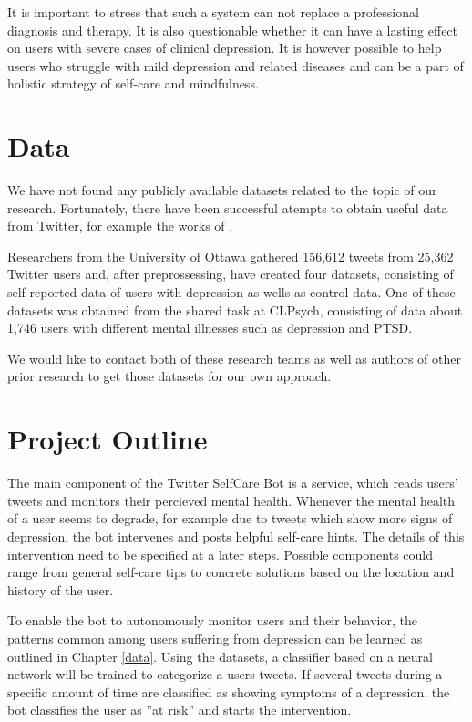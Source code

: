 \documentclass[colorback,accentcolor=tud9c]{tudreport}
\begin{document}
It is important to stress that such a system can not replace a professional diagnosis and therapy. It is also questionable whether it can have a lasting effect on users with severe cases of clinical depression. It is however possible to help users who struggle with mild depression and related diseases and can be a part of holistic strategy of self-care and mindfulness.

\section*{Data}
\label{data}

We have not found any publicly available datasets related to the topic of our research. Fortunately, there have been successful atempts to obtain useful data from Twitter, for example the works of \textcite{coppersmith2015clpsych,jamil_monitoring_2017}. 

Researchers from the University of Ottawa gathered 156,612 tweets from 25,362 Twitter users and, after preprossessing, have created four datasets, consisting of self-reported data of users with depression as wells as control data. One of these datasets was obtained from the shared task at CLPsych, consisting of data about 1,746 users with different mental illnesses such as depression and PTSD.

We would like to contact both of these research teams as well as authors of other prior research to get those datasets for our own approach. 

\section*{Project Outline}

The main component of the Twitter SelfCare Bot is a service, which reads users' tweets and monitors their percieved mental health. Whenever the mental health of a user seems to degrade, for example due to tweets which show more signs of depression, the bot intervenes and posts helpful self-care hints. The details of this intervention need to be specified at a later steps. Possible components could range from general self-care tips to concrete solutions based on the location and history of the user.

To enable the bot to autonomously monitor users and their behavior, the patterns common among users suffering from depression can be learned as outlined in Chapter \ref{data}. Using the datasets, a classifier based on a neural network will be trained to categorize a users tweets. If several tweets during a specific amount of time are classified as showing symptoms of a depression, the bot classifies the user as ''at risk'' and starts the intervention.
\end{document}
